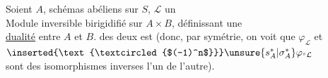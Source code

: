   Soient $A$,   schémas abéliens sur $S$,   $\mathcal L$ un\\
Module inversible birigidifié sur $A\times B$, définissant une\\
\uline{dualité} entre $A$ et $B$.   des deux
est   (donc, par symétrie, on voit que $\varphi_{\mathcal L}$ et $\inserted{\text{\textcircled{$(-1)^n$}}}\unsure{s_A^*|\sigma_A^*}\varphi_{{}^s\mathcal L}$\\
sont des isomorphismes inverses l'un de l'autre).
